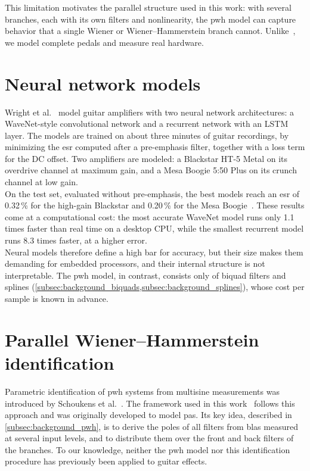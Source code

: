 This limitation motivates the parallel structure used in this work: with several branches, each with its own filters and nonlinearity, the \gls{pwh} model can capture behavior that a single Wiener or Wiener--Hammerstein branch cannot. Unlike~\cite{eichas2016blackbox}, we model complete pedals and measure real hardware.

\section{Neural network models}
\label{sec:related_neural}

Wright et al.~\cite{wright2020realtime} model guitar amplifiers with two neural network architectures: a WaveNet-style convolutional network and a recurrent network with an LSTM layer. The models are trained on about three minutes of guitar recordings, by minimizing the \gls{esr} computed after a pre-emphasis filter, together with a loss term for the DC offset. Two amplifiers are modeled: a Blackstar HT-5 Metal on its overdrive channel at maximum gain, and a Mesa Boogie 5:50 Plus on its crunch channel at low gain.\\

On the test set, evaluated without pre-emphasis, the best models reach an \gls{esr} of 0.32\,\% for the high-gain Blackstar and 0.20\,\% for the Mesa Boogie~\cite{wright2020realtime}. These results come at a computational cost: the most accurate WaveNet model runs only 1.1 times faster than real time on a desktop CPU, while the smallest recurrent model runs 8.3 times faster, at a higher error.\\

Neural models therefore define a high bar for accuracy, but their size makes them demanding for embedded processors, and their internal structure is not interpretable. The \gls{pwh} model, in contrast, consists only of biquad filters and splines (\cref{subsec:background_biquads,subsec:background_splines}), whose cost per sample is known in advance.

\section{Parallel Wiener--Hammerstein identification}
\label{sec:related_pwh}

Parametric identification of \gls{pwh} systems from multisine measurements was introduced by Schoukens et al.~\cite{schoukens2015pwh}. The framework used in this work~\cite{pwh_pa_code} follows this approach and was originally developed to model \glspl{pa}. Its key idea, described in \cref{subsec:background_pwh}, is to derive the poles of all filters from \glspl{bla} measured at several input levels, and to distribute them over the front and back filters of the branches. To our knowledge, neither the \gls{pwh} model nor this identification procedure has previously been applied to guitar effects.

